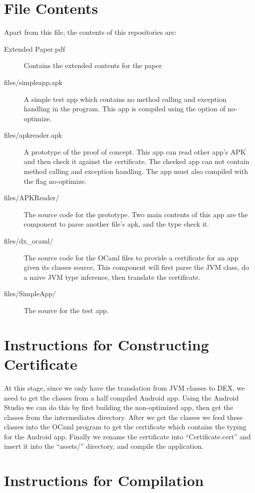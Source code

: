 \documentclass[a4]{article}
\begin{document}
\section{File Contents}
Apart from this file, the contents of this repositories are:
\begin{description}
  \item[Extended Paper.pdf] Contains the extended contents for the paper
  \item[files/simpleapp.apk] A simple test app which contains no method calling and    
    exception handling in the program. This app is compiled using the option of 
    no-optimize.
  \item[files/apkreader.apk] A prototype of the proof of concept. This app can read other
    app's APK and then check it against the certificate. The checked app can not contain
    method calling and exception handling. The app must also compiled with the flag
    no-optimize.
  \item[files/APKReader/] The source code for the prototype. Two main contents of this
    app are the component to parse another file's apk, and the type check it.
  \item[files/dx\_ocaml/] The source code for the OCaml files to provide a certificate
    for an app given its classes source. This component will first parse the JVM class,
    do a naive JVM type inference, then translate the certificate. 
  \item[files/SimpleApp/] The source for the test app.
\end{description}

\section{Instructions for Constructing Certificate}
At this stage, since we only have the translation from JVM classes to DEX, we need to 
get the classes from a half compiled Android app. Using the Android Studio we can do
this by first building the non-optimized app, then get the classes from the 
intermediates directory. After we get the classes we feed these classes into the OCaml
program to get the certificate which contains the typing for the Android app. Finally
we rename the certificate into ``Certificate.cert'' and insert it into the ``assets/''
directory, and compile the application.

\section{Instructions for Compilation}
\end{document}
